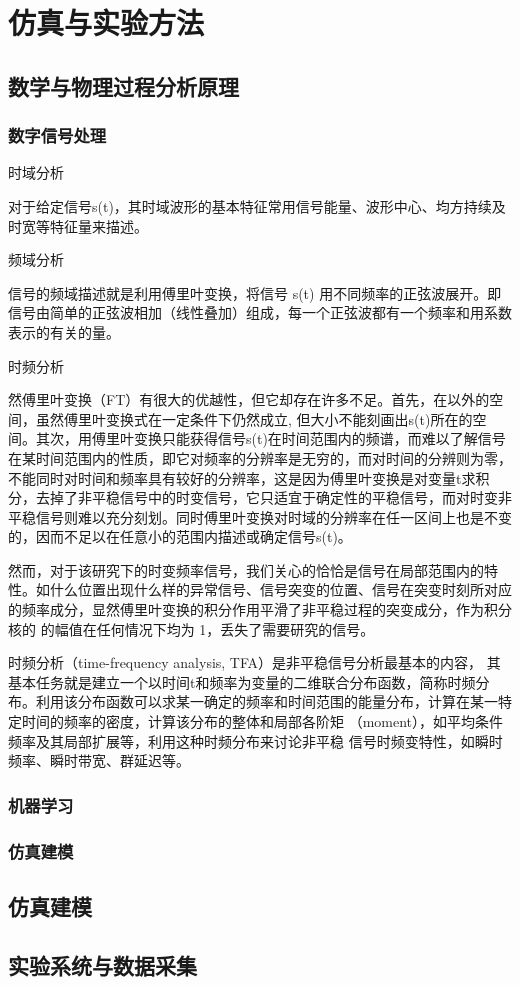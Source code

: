 \chapter{仿真与实验方法}
\section{数学与物理过程分析原理}
\subsection{数字信号处理}
时域分析

对于给定信号s(t)，其时域波形的基本特征常用信号能量、波形中心、均方持续及时宽等特征量来描述。

频域分析

信号的频域描述就是利用傅里叶变换，将信号 s(t) 用不同频率的正弦波展开。即信号由简单的正弦波相加（线性叠加）组成，每一个正弦波都有一个频率和用系数表示的有关的量。

时频分析

然傅里叶变换（FT）有很大的优越性，但它却存在许多不足。首先，在以外的空间，虽然傅里叶变换式在一定条件下仍然成立, 但大小不能刻画出s(t)所在的空间。其次，用傅里叶变换只能获得信号s(t)在时间范围内的频谱，而难以了解信号在某时间范围内的性质，即它对频率的分辨率是无穷的，而对时间的分辨则为零，不能同时对时间和频率具有较好的分辨率，这是因为傅里叶变换是对变量t求积分，去掉了非平稳信号中的时变信号，它只适宜于确定性的平稳信号，而对时变非平稳信号则难以充分刻划。同时傅里叶变换对时域的分辨率在任一区间上也是不变的，因而不足以在任意小的范围内描述或确定信号s(t)。

然而，对于该研究下的时变频率信号，我们关心的恰恰是信号在局部范围内的特性。如什么位置出现什么样的异常信号、信号突变的位置、信号在突变时刻所对应的频率成分，显然傅里叶变换的积分作用平滑了非平稳过程的突变成分，作为积分核的 的幅值在任何情况下均为 1，丢失了需要研究的信号。

时频分析（time-frequency analysis, TFA）是非平稳信号分析最基本的内容， 其基本任务就是建立一个以时间t和频率为变量的二维联合分布函数，简称时频分布。利用该分布函数可以求某一确定的频率和时间范围的能量分布，计算在某一特定时间的频率的密度，计算该分布的整体和局部各阶矩 （moment），如平均条件频率及其局部扩展等，利用这种时频分布来讨论非平稳 信号时频变特性，如瞬时频率、瞬时带宽、群延迟等。

\subsection{机器学习}
\subsection{仿真建模}

\section{仿真建模}
\section{实验系统与数据采集}
